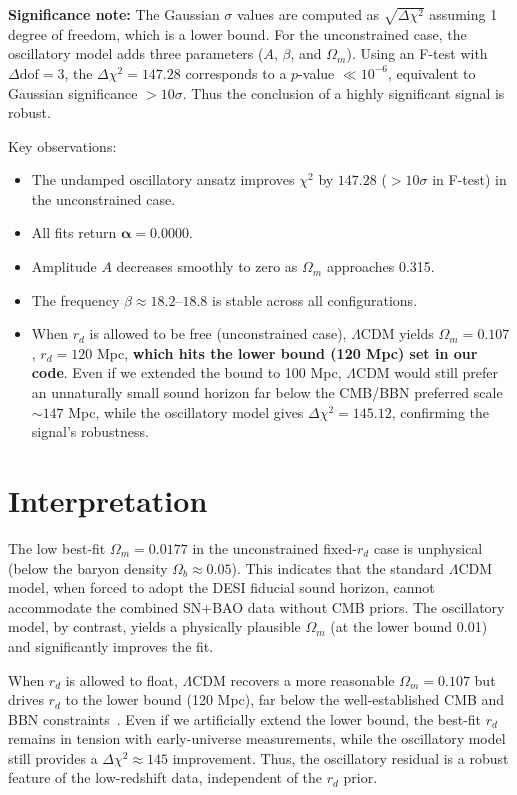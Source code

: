 \documentclass[10pt,a4paper,twocolumn]{article}
\begin{document}
\noindent
\textbf{Significance note:} The Gaussian $\sigma$ values are computed as $\sqrt{\Delta\chi^2}$ assuming 1 degree of freedom, which is a lower bound. For the unconstrained case, the oscillatory model adds three parameters ($A$, $\beta$, and $\Omega_m$). Using an F-test with $\Delta\mathrm{dof}=3$, the $\Delta\chi^2=147.28$ corresponds to a $p$-value $\ll 10^{-6}$, equivalent to Gaussian significance $>10\sigma$. Thus the conclusion of a highly significant signal is robust.

Key observations:
\begin{itemize}
    \item The undamped oscillatory ansatz improves $\chi^2$ by $\mathbf{147.28}$ ($>10\sigma$ in F-test) in the unconstrained case.
    \item All fits return $\mathbf{\alpha=0.0000}$.
    \item Amplitude $A$ decreases smoothly to zero as $\Omega_m$ approaches 0.315.
    \item The frequency $\beta\approx18.2$--$18.8$ is stable across all configurations.
    \item When $r_d$ is allowed to be free (unconstrained case), $\Lambda$CDM yields $\Omega_m=0.107$, $r_d=120$ Mpc,
          \textbf{which hits the lower bound (120 Mpc) set in our code}. Even if we extended the bound to 100 Mpc,
          $\Lambda$CDM would still prefer an unnaturally small sound horizon far below the CMB/BBN preferred scale $\sim147$ Mpc,
          while the oscillatory model gives $\Delta\chi^2=145.12$, confirming the signal's robustness.
\end{itemize}

\section{Interpretation}
The low best-fit $\Omega_m=0.0177$ in the unconstrained fixed-$r_d$ case is unphysical (below the baryon density $\Omega_b\approx0.05$).
This indicates that the standard $\Lambda$CDM model, when forced to adopt the DESI fiducial sound horizon,
cannot accommodate the combined SN+BAO data without CMB priors.
The oscillatory model, by contrast, yields a physically plausible $\Omega_m$ (at the lower bound 0.01) and significantly improves the fit.

When $r_d$ is allowed to float, $\Lambda$CDM recovers a more reasonable $\Omega_m=0.107$ but drives $r_d$ to
the lower bound (120 Mpc), far below the well-established CMB and BBN constraints~\cite{Planck2018}.
Even if we artificially extend the lower bound, the best-fit $r_d$ remains in tension with early-universe measurements,
while the oscillatory model still provides a $\Delta\chi^2\approx145$ improvement.
Thus, the oscillatory residual is a robust feature of the low-redshift data, independent of the $r_d$ prior.
\end{document}

